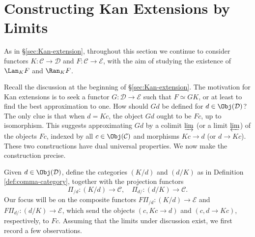 
\section{Constructing Kan Extensions by Limits}\label{sec:Kan-as-limit}
\hypertarget{o014.aljabr2.chapter1.kan-extensions-as-limits}{ }

As in \S\ref{sec:Kan-extension}, throughout this section we continue to
consider functors $K: \mathcal{C} \to \mathcal{D}$ and
$F: \mathcal{C} \to \mathcal{E}$, with the aim of studying the existence of
$\Lan_K F$ and $\Ran_K F$.

Recall the discussion at the beginning of \S\ref{sec:Kan-extension}. The
motivation for Kan extensions is to seek a functor
$G: \mathcal{D} \to \mathcal{E}$ such that $F \simeq GK$, or at least to find
the best approximation to one. How should $Gd$ be defined for
$d \in \Obj(\mathcal{D})$? The only clue is that when $d=Kc$, the object $Gd$
ought to be $Fc$, up to isomorphism. This suggests approximating $Gd$ by a
colimit $\varinjlim$ (or a limit $\varprojlim$) of the objects $Fc$, indexed by
	all $c \in \Obj(\mathcal{C})$ and morphisms $Kc \to d$ (or $d \to Kc$).
	These two constructions have dual universal properties. We now make the
	construction precise.

Given $d \in \Obj(\mathcal{D})$, define the categories $(K/d)$ and $(d/K)$ as
in Definition \ref{def:comma-category}, together with the projection functors
\[ \Pi_{/d}: (K/d) \to \mathcal{C}, \quad \Pi_{d/}: (d/K) \to \mathcal{C}. \]
Our focus will be on the composite functors
$F\Pi_{/d}: (K/d) \to \mathcal{E}$ and
$F\Pi_{d/}: (d/K) \to \mathcal{E}$, which send the objects
$(c,Kc \to d)$ and $(c,d \to Kc)$, respectively, to $Fc$. Assuming that the
limits under discussion exist, we first record a few observations.

